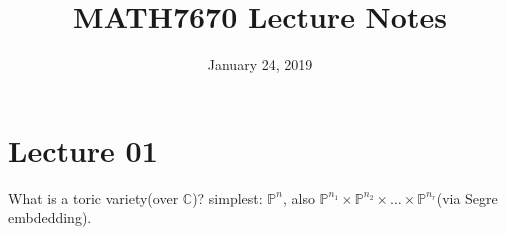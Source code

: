 \documentclass[a4paper,12pt]{amsart}
\title{MATH7670 Lecture Notes}
\author{}
\date{January 24, 2019}
\newcommand{\CC}{\mathbb{C}}
\newcommand{\PP}{\mathbb{P}}
\begin{document}
\maketitle
\newtheorem{Lemma}{Lemma}
\newtheorem{Proposition}{Proposition}[section]
\newtheorem{Theorem}{Theorem}[section]
\newtheorem{Corollary}{Corollary}
\newtheorem*{Conjecture}{Conjecture}
\newtheorem{theorem}{Theorem}[section]
\newtheorem{corollary}[theorem]{Corollary}

\theoremstyle{definition}
\newtheorem*{Problem}{Problem}
\newtheorem*{Def}{Definition}
\newtheorem{Eg}{Example}[section]
\newtheorem*{exercise}{Exercise}
\newtheorem{remark}{Remark}
\newtheorem{example}{Example}
\newtheorem{proposition}{Proposition}
\newtheorem{definition}{Definition}

\theoremstyle{remark}
\newtheorem*{Remark}{Remark}
\newtheorem*{Caution}{\bf{Caution}}
\newtheorem*{Fact}{Fact}
\newtheorem*{Note}{Note}


\section{Lecture 01}

What is a toric variety(over $\CC$)? simplest: $\PP^n$, also $\PP^{n_1}\times\PP^{n_2}\times\dots\times\PP^{n_r}$(via Segre embdedding).
\end{document}
